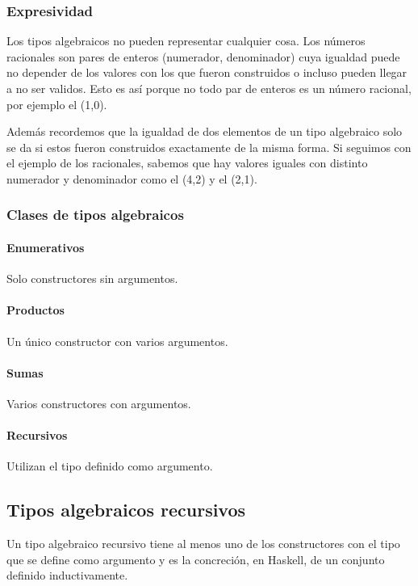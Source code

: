\subsubsection{Expresividad}
Los tipos algebraicos no pueden representar cualquier cosa. Los números racionales son pares de enteros (numerador, denominador) cuya igualdad puede no depender de los valores con los que fueron construidos o incluso pueden llegar a no ser validos. Esto es así porque no todo par de enteros es un número racional, por ejemplo el (1,0). 

Además recordemos que la igualdad de dos elementos de un tipo algebraico solo se da si estos fueron construidos exactamente de la misma forma. Si seguimos con el ejemplo de los racionales, sabemos que hay valores iguales con distinto numerador y denominador como el (4,2) y el (2,1).

\subsubsection{Clases de tipos algebraicos}

\paragraph{Enumerativos} Solo constructores sin argumentos.

\paragraph{Productos} Un único constructor con varios argumentos.

\paragraph{Sumas} Varios constructores con argumentos.

\paragraph{Recursivos} Utilizan el tipo definido como argumento.

\subsection{Tipos algebraicos recursivos}
Un tipo algebraico recursivo tiene al menos uno de los constructores con el tipo que se define como argumento y es la concreción, en Haskell, de un conjunto definido inductivamente.

